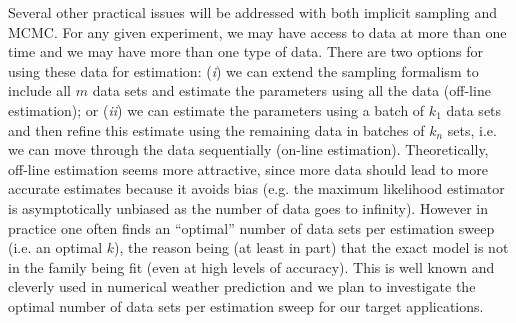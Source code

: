 \documentclass[11pt]{article}
\newcommand{\MarginPar}[1]{\marginpar{%
\vskip-\baselineskip %
\raggedright\tiny\sffamily
\hrule\smallskip{\color{red}#1}\par\smallskip\hrule}}
\begin{document}
%

Several other practical issues will be addressed with both implicit sampling and MCMC.
For any given experiment, we may have access to data at more than one time and we may have more than one type of data.
There are two options for using these data for estimation:
(\emph{i}) we can extend the
sampling formalism to include all $m$ data sets and estimate the parameters using all the data (off-line estimation); or
(\emph{ii}) we can estimate the parameters using a batch of $k_1$ data sets and then refine this estimate using
the remaining data in batches of $k_n$ sets, i.e. we can move through the data sequentially (on-line estimation).
Theoretically, off-line estimation seems more attractive, since more data should lead to more accurate estimates because it avoids bias (e.g. the maximum likelihood estimator is asymptotically unbiased as the number of data goes to infinity). However in practice one often finds an ``optimal'' number of data sets per estimation sweep (i.e. an optimal $k$), the reason being (at least in part) that the exact model is not in the family being fit (even at high levels of  accuracy).
This is well known and cleverly used in numerical weather prediction and we plan to investigate the optimal number of data sets per estimation sweep for our target applications. 
\end{document}
